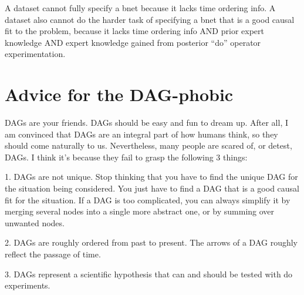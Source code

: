 A dataset cannot fully specify a
bnet because it lacks time ordering info. A dataset also cannot do the harder
task of specifying a bnet that is a good causal fit to the problem, because
it lacks time ordering info AND prior expert knowledge AND expert knowledge
gained from posterior ``do” operator experimentation.

\section{Advice for the DAG-phobic}

DAGs are your friends. DAGs should be easy and fun to dream up. After all, I
am convinced that DAGs are an integral part of how humans think, so they
should come naturally to us.  Nevertheless, many people are scared of, or
detest, DAGs. I think it’s because they fail to grasp the following 3 things:

1. DAGs are not unique. Stop thinking that you have to find the unique DAG
for the situation being considered. You just have to find a DAG that is a
good causal fit for the situation. If a DAG is too complicated, you can
always simplify it by merging several nodes into a single more abstract one,
or by summing over unwanted nodes.

2. DAGs are roughly ordered from past to present. The arrows of a DAG roughly
reflect the passage of time.

3. DAGs represent a scientific hypothesis that can and should be tested with
do experiments.
